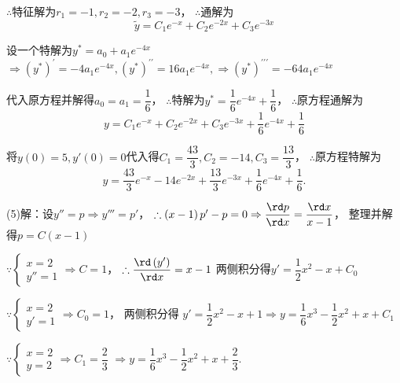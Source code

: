   $\therefore $特征解为$ {r_1} = - 1,{r_2} = - 2,{r_3} = - 3$，
  $\therefore $通解为
  \[\tilde y = {C_1}{e^{ - x}} + {C_2}{e^{ - 2x}} + {C_3}{e^{ - 3x}}\]

  设一个特解为${y^*} = {a_0} + {a_1}{e^{ - 4x}}$
  $ \Rightarrow {\left( {{y^*}} \right)^\prime } =  - 4{a_1}{e^{ - 4x}},{\left( {{y^*}} \right)^{\prime \prime }} = 16{a_1}{e^{ - 4x}}, \Rightarrow {\left( {{y^*}} \right)^{\prime \prime \prime }} =  - 64{a_1}{e^{ - 4x}}$

  代入原方程并解得${a_0} = {a_1} = \dfrac {1}{6}$，
  $\therefore $特解为${y^*} = \dfrac{1}{6}{e^{ - 4x}} + \dfrac{1}{6}$，
  $\therefore $原方程通解为
  \[y = {C_1}{e^{ - x}} + {C_2}{e^{ - 2x}} + {C_3}{e^{ - 3x}} + \dfrac{1}{6}{e^{ - 4x}} + \dfrac{1}{6}\]

  将$y\left( 0 \right) = 5,y'\left( 0 \right) = 0$代入得${C_1} = \dfrac {43}{3}, {C_2} = - 14, {C_3} = \dfrac {13}{3}$，
  $\therefore $原方程特解为
  \[y = \dfrac{{43}}{3}{e^{ - x}} - 14{e^{ - 2x}} + \dfrac{{13}}{3}{e^{ - 3x}} + \dfrac{1}{6}{e^{ - 4x}} + \dfrac{1}{6}.\]

  (5)解：设$y'' = p \Rightarrow y''' = p'$，
  $\therefore \left( {x - 1} \right)p' - p = 0 \Rightarrow \dfrac {\rd p}{\rd x} = \dfrac {\rd x}{x - 1}$，
  整理并解得$p = C\left( {x - 1} \right)$

  $\because \begin{cases}
    {x = 2} \\
    {y'' = 1}
  \end{cases} \Rightarrow C = 1$，
  $\therefore \dfrac{{\rd \left( {y'} \right)}}{{\rd x}} = x - 1$
  两侧积分得$y' = \dfrac{1}{2}{x^2} - x + {C_0}$

  $\because \begin{cases}
    {x = 2} \\
    {y' = 1}
  \end{cases} \Rightarrow {C_0} = 1$，
  两侧积分得
  $y' = \dfrac{1}{2}{x^2} - x + 1 \Rightarrow y = \dfrac{1}{6}{x^3} - \dfrac{1}{2}{x^2} + x + {C_1}$

  $\because \begin{cases}
    {x = 2} \\
    {y = 2}
  \end{cases} \Rightarrow {C_1} = \dfrac {2}{3}$
  $\Rightarrow y = \dfrac{1}{6}{x^3} - \dfrac{1}{2}{x^2} + x + \dfrac{2}{3}$.